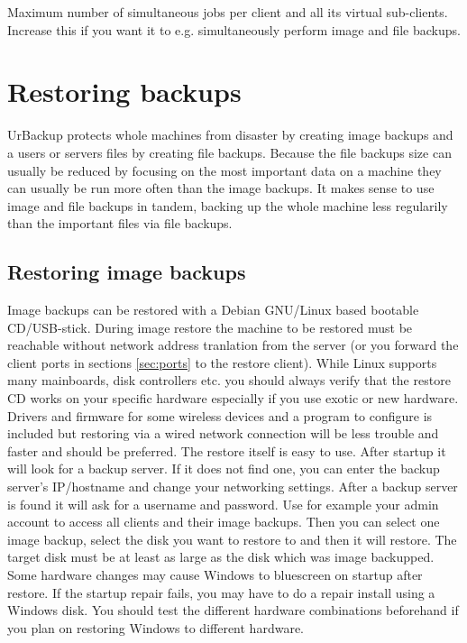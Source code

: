 \documentclass[a4paper,10pt]{article}
\begin{document}
Maximum number of simultaneous jobs per client and all its virtual sub-clients. Increase this if you want it to e.g. simultaneously perform image and file backups.

\section{Restoring backups}

UrBackup protects whole machines from disaster by creating image backups and a users or servers files by creating file backups. Because the file backups size can usually be reduced by focusing on the most important data on a machine they can usually be run more often than the image backups. It makes sense to use image and file backups in tandem, backing up the whole machine less regularily than the important files via file backups.

\subsection{Restoring image backups}

Image backups can be restored with a Debian GNU/Linux based bootable CD/USB-stick. During image restore the machine to be restored must be reachable without network address tranlation from the server (or you forward the client ports in sections \ref{sec:ports} to the restore client).
While Linux supports many mainboards, disk controllers etc. you should always verify that the restore CD works on your specific hardware especially if you use exotic or new hardware.
Drivers and firmware for some wireless devices and a program to configure is included but restoring via a wired network connection will be less trouble and faster and should be preferred.
The restore itself is easy to use. After startup it will look for a backup server. If it does not find one, you can enter the backup server's IP/hostname and change your networking settings. After a backup server is found it will ask for a username and password. Use for example your admin account to access all clients and their image backups.
Then you can select one image backup, select the disk you want to restore to and then it will restore. The target disk must be at least as large as the disk which was image backupped.
Some hardware changes may cause Windows to bluescreen on startup after restore. If the startup repair fails, you may have to do a repair install using a Windows disk. You should test the different hardware combinations beforehand if you plan on restoring Windows to different hardware.
\end{document}
